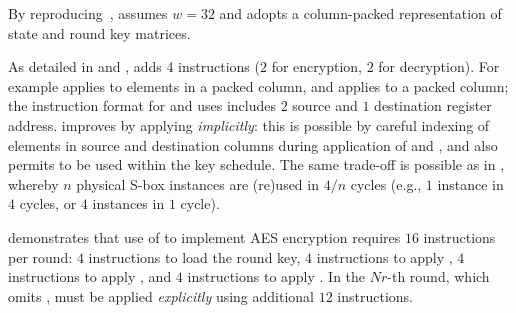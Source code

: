 
By reproducing~\cite[Section 4.3]{TilGro:06},
assumes 
$w = 32$
and adopts a 
column-packed 
representation of state and round key matrices.

As detailed in
and
,
adds
$ 4$
instructions ($2$ for encryption, $2$ for decryption).
For example
applies 
  to elements in   a packed column,
and
applies 
 to               a packed column;
the instruction format for
and
uses 
includes $2$ source and $1$ destination register address.
 improves  by applying  
{\em implicitly}:
this is possible by careful indexing of elements in source and destination
columns during application of  and ,
and also permits
to be used within the key schedule.
The same trade-off is possible as in , whereby
$n$ physical S-box instances are (re)used in $4/n$ cycles
(e.g., $1$ instance in $4$ cycles, or $4$ instances in $1$ cycle).

demonstrates that use of  to implement AES encryption requires
$16$ instructions per round:
$ 4$            
     instructions to load the round key,
$ 4$            
     instructions to apply ,
$ 4$   
     instructions to apply ,
     and
$ 4$   
     instructions to apply .
In the $Nr$-th round, which omits ,
 must be applied
{\em explicitly}
using additional 
$12$ instructions.

